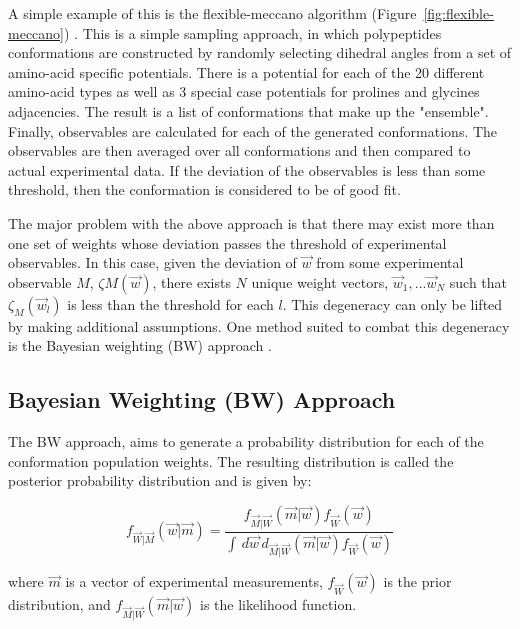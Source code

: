 \documentclass{article}
\newcommand{\reffig}[1]{Figure~\ref{#1}}
\begin{document}
A simple example of this is the flexible-meccano algorithm (\reffig{fig:flexible-meccano}) \cite{ozenneFlexiblemeccanoToolGeneration2012}.
This is a simple sampling approach, in which polypeptides conformations are constructed by randomly selecting dihedral angles from a set of amino-acid specific potentials.
There is a potential for each of the 20 different amino-acid types as well as 3 special case potentials for prolines and glycines adjacencies.
The result is a list of conformations that make up the "ensemble".
Finally, observables are calculated for each of the generated conformations.
The observables are then averaged over all conformations and then compared to actual experimental data.
If the deviation of the observables is less than some threshold, then the conformation is considered to be of good fit.

The major problem with the above approach is that there may exist more than one set of weights whose deviation passes the threshold of experimental observables.
In this case, given the deviation of $\vec w$ from some experimental observable $M$,  $\zeta{M}(\vec w)$, there exists $N$ unique weight vectors, 
$\vec w_1,...\vec w_N$ such that $\zeta_{M}(\vec w_l)$ is less than the threshold for each $l$. 
This degeneracy can only be lifted by making additional assumptions. 
One method suited to combat this degeneracy is the Bayesian weighting (BW) approach \cite{fisherModelingIntrinsicallyDisordered2010}.

\subsection{Bayesian Weighting (BW) Approach}

The BW approach, \cite{fisherModelingIntrinsicallyDisordered2010} aims to generate a probability distribution for each of the conformation population weights.
The resulting distribution is called the posterior probability distribution and is given by:


\begin{equation}
    f_{\vec W | \vec M} \left ( \vec w | \vec m \right ) = \frac{f_{\vec M | \vec W} \left ( \vec m | \vec w \right ) f_{\vec W} \left( \vec w \right ) }{\int \, d\vec w \, d_{\vec M| \vec W} \left (\vec m| \vec w \right) f_{\vec W} \left (\vec w \right) }
\end{equation}

where $\vec m$ is a vector of experimental measurements, $f_{\vec W} (\vec w)$ is the prior distribution, and $f_{\vec M | \vec W} \left ( \vec m | \vec w \right )$ is the likelihood function.
\end{document}
